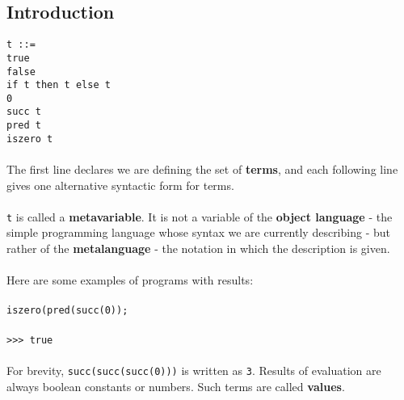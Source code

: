 \documentclass{article}
\begin{document}
\subsection{Introduction}
\texttt{t ::=}\\
\null\qquad \texttt{true}\\
\null\qquad \texttt{false}\\
\null\qquad \texttt{if t then t else t}\\
\null\qquad \texttt{0}\\
\null\qquad \texttt{succ t}\\
\null\qquad \texttt{pred t}\\
\null\qquad \texttt{iszero t}\\\\
The first line declares we are defining the set of \textbf{terms}, and each following line gives one alternative syntactic form for terms.\\\\
\texttt{t} is called a \textbf{metavariable}. It is not a variable of the \textbf{object language} - the simple programming language whose syntax we are currently describing - 
but rather of the \textbf{metalanguage} - the notation in which the description is given.\\\\
Here are some examples of programs with results:\\\\
\texttt{iszero(pred(succ(0));}\\\\
\texttt{>>> true}\\\\
For brevity, \texttt{succ(succ(succ(0)))} is written as \texttt{3}. Results of evaluation are always boolean constants or numbers. Such terms are called \textbf{values}.
\end{document}

